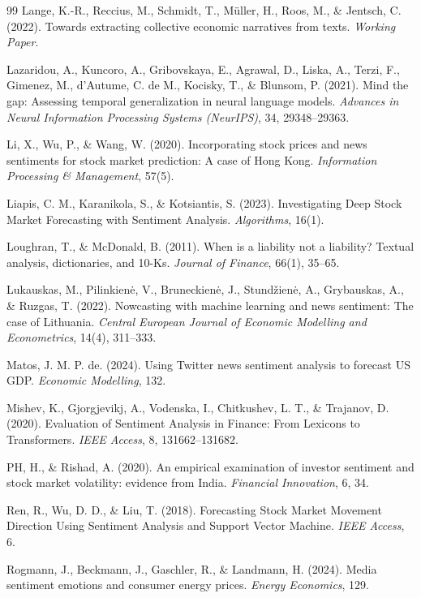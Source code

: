 \documentclass[12pt,oneside]{article}
\begin{document}
\begin{thebibliography}{99}
 Lange, K.-R., Reccius, M., Schmidt, T., Müller, H., Roos, M., \& Jentsch, C. (2022). Towards extracting collective economic narratives from texts. \textit{Working Paper}.

 Lazaridou, A., Kuncoro, A., Gribovskaya, E., Agrawal, D., Liska, A., Terzi, F., Gimenez, M., d'Autume, C. de M., Kocisky, T., \& Blunsom, P. (2021). Mind the gap: Assessing temporal generalization in neural language models. \textit{Advances in Neural Information Processing Systems (NeurIPS)}, 34, 29348--29363.

 Li, X., Wu, P., \& Wang, W. (2020). Incorporating stock prices and news sentiments for stock market prediction: A case of Hong Kong. \textit{Information Processing \& Management}, 57(5).

 Liapis, C. M., Karanikola, S., \& Kotsiantis, S. (2023). Investigating Deep Stock Market Forecasting with Sentiment Analysis. \textit{Algorithms}, 16(1).

 Loughran, T., \& McDonald, B. (2011). When is a liability not a liability? Textual analysis, dictionaries, and 10-Ks. \textit{Journal of Finance}, 66(1), 35--65.

 Lukauskas, M., Pilinkienė, V., Bruneckienė, J., Stundžienė, A., Grybauskas, A., \& Ruzgas, T. (2022). Nowcasting with machine learning and news sentiment: The case of Lithuania. \textit{Central European Journal of Economic Modelling and Econometrics}, 14(4), 311--333.

 Matos, J. M. P. de. (2024). Using Twitter news sentiment analysis to forecast US GDP. \textit{Economic Modelling}, 132.

 Mishev, K., Gjorgjevikj, A., Vodenska, I., Chitkushev, L. T., \& Trajanov, D. (2020). Evaluation of Sentiment Analysis in Finance: From Lexicons to Transformers. \textit{IEEE Access}, 8, 131662--131682.

 PH, H., \& Rishad, A. (2020). An empirical examination of investor sentiment and stock market volatility: evidence from India. \textit{Financial Innovation}, 6, 34.

 Ren, R., Wu, D. D., \& Liu, T. (2018). Forecasting Stock Market Movement Direction Using Sentiment Analysis and Support Vector Machine. \textit{IEEE Access}, 6.

 Rogmann, J., Beckmann, J., Gaschler, R., \& Landmann, H. (2024). Media sentiment emotions and consumer energy prices. \textit{Energy Economics}, 129.


\end{thebibliography}
\end{document}
